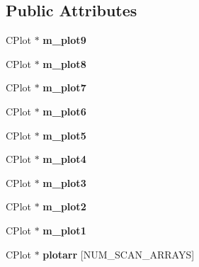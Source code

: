 \subsection*{Public Attributes}
\begin{DoxyCompactItemize}
\item 
\hypertarget{class_c_freq_scan_afb65c7d6939324d24ac391016f1afb8d}{C\-Plot $\ast$ {\bfseries m\-\_\-plot9}}\label{class_c_freq_scan_afb65c7d6939324d24ac391016f1afb8d}

\item 
\hypertarget{class_c_freq_scan_a47f1d9900948702e60065006da6ab602}{C\-Plot $\ast$ {\bfseries m\-\_\-plot8}}\label{class_c_freq_scan_a47f1d9900948702e60065006da6ab602}

\item 
\hypertarget{class_c_freq_scan_a9a0370217bc41e5acdd6736a3c57be2c}{C\-Plot $\ast$ {\bfseries m\-\_\-plot7}}\label{class_c_freq_scan_a9a0370217bc41e5acdd6736a3c57be2c}

\item 
\hypertarget{class_c_freq_scan_ad141ebc76f3796971f0f679642b49999}{C\-Plot $\ast$ {\bfseries m\-\_\-plot6}}\label{class_c_freq_scan_ad141ebc76f3796971f0f679642b49999}

\item 
\hypertarget{class_c_freq_scan_ac2ee2b2e193090328759ed86e7c8bf61}{C\-Plot $\ast$ {\bfseries m\-\_\-plot5}}\label{class_c_freq_scan_ac2ee2b2e193090328759ed86e7c8bf61}

\item 
\hypertarget{class_c_freq_scan_a30d457915879bd2db5fa4ae43d513660}{C\-Plot $\ast$ {\bfseries m\-\_\-plot4}}\label{class_c_freq_scan_a30d457915879bd2db5fa4ae43d513660}

\item 
\hypertarget{class_c_freq_scan_a720e68dc6b58689bae00e1c50d4da015}{C\-Plot $\ast$ {\bfseries m\-\_\-plot3}}\label{class_c_freq_scan_a720e68dc6b58689bae00e1c50d4da015}

\item 
\hypertarget{class_c_freq_scan_aaac7ae494f1bf20f09ffbabac85a2f04}{C\-Plot $\ast$ {\bfseries m\-\_\-plot2}}\label{class_c_freq_scan_aaac7ae494f1bf20f09ffbabac85a2f04}

\item 
\hypertarget{class_c_freq_scan_a3ebb1aa846b9d0df0f01f7e563328f11}{C\-Plot $\ast$ {\bfseries m\-\_\-plot1}}\label{class_c_freq_scan_a3ebb1aa846b9d0df0f01f7e563328f11}

\item 
\hypertarget{class_c_freq_scan_aa40529427f342822c505bb4864867d3e}{C\-Plot $\ast$ {\bfseries plotarr} \mbox{[}N\-U\-M\-\_\-\-S\-C\-A\-N\-\_\-\-A\-R\-R\-A\-Y\-S\mbox{]}}\label{class_c_freq_scan_aa40529427f342822c505bb4864867d3e}


\end{DoxyCompactItemize}
